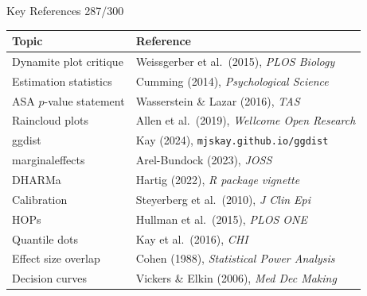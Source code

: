 \documentclass[10pt]{beamer}
\newcommand{\smark}[1]{\hfill{\scriptsize\color{codegray}#1}}
\begin{document}
\begin{frame}{Key References}
\smark{287/300}
\centering\scriptsize
\begin{tabular}{@{}ll@{}}
    \toprule
    \textbf{Topic} & \textbf{Reference} \\
    \midrule
    Dynamite plot critique  & Weissgerber et al.\ (2015), \textit{PLOS Biology} \\
    Estimation statistics   & Cumming (2014), \textit{Psychological Science} \\
    ASA $p$-value statement & Wasserstein \& Lazar (2016), \textit{TAS} \\
    Raincloud plots         & Allen et al.\ (2019), \textit{Wellcome Open Research} \\
    ggdist                  & Kay (2024), \texttt{mjskay.github.io/ggdist} \\
    marginaleffects         & Arel-Bundock (2023), \textit{JOSS} \\
    DHARMa                  & Hartig (2022), \textit{R package vignette} \\
    Calibration             & Steyerberg et al.\ (2010), \textit{J Clin Epi} \\
    HOPs                    & Hullman et al.\ (2015), \textit{PLOS ONE} \\
    Quantile dots           & Kay et al.\ (2016), \textit{CHI} \\
    Effect size overlap     & Cohen (1988), \textit{Statistical Power Analysis} \\
    Decision curves         & Vickers \& Elkin (2006), \textit{Med Dec Making} \\
    \bottomrule
\end{tabular}
\end{frame}
\end{document}
